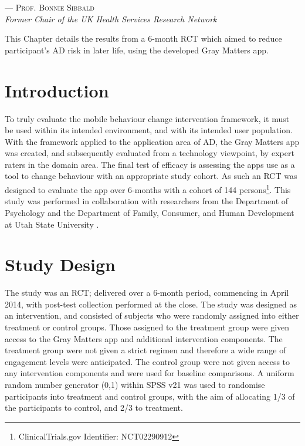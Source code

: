  \label{chapter: prevention-rctresults}

\setlength{\epigraphwidth}{.50\textwidth}
\begin{epigraphs}
{--- \textsc{Prof. Bonnie Sibbald} \\ \textit{Former Chair of the UK Health Services Research Network}}
\end{epigraphs}

This Chapter details the results from a 6-month RCT which aimed to reduce participant's AD risk in later life, using the developed Gray Matters app.

\section{Introduction}
To truly evaluate the mobile behaviour change intervention framework, it must be used within its intended environment, and with its intended user population. With the framework applied to the application area of AD, the Gray Matters app was created, and subsequently evaluated from a technology viewpoint, by expert raters in the domain area. The final test of efficacy is assessing the apps use as a tool to change behaviour with an appropriate study cohort. As such an RCT was designed to evaluate the app over 6-months with a cohort of 144 persons\footnote{ClinicalTrials.gov Identifier: NCT02290912}. This study was performed in collaboration with researchers from the Department of Psychology and the Department of Family, Consumer, and Human Development at Utah State University \cite{Norton2015-TRCI}. 

\section{Study Design}
The study was an RCT; delivered over a 6-month period, commencing in April 2014, with post-test collection performed at the close.
The study was designed as an intervention, and consisted of subjects who were randomly assigned into either treatment or control groups. Those assigned to the treatment group were given access to the Gray Matters app and additional intervention components. The treatment group were not given a strict regimen and therefore a wide range of engagement levels were anticipated. The control group were not given access to any intervention components and were used for baseline comparisons. A uniform random number generator (0,1) within SPSS v21 was used to randomise participants into treatment and control groups, with the aim of allocating 1/3 of the participants to control, and 2/3 to treatment.


